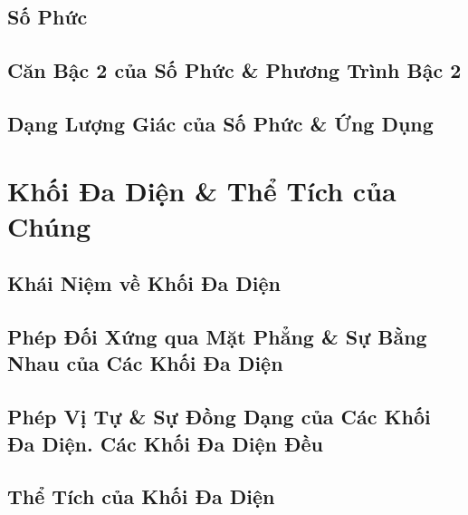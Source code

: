 \documentclass{article}
\numberwithin{equation}{section}
\begin{document}
\subsection{Số Phức}


\subsection{Căn Bậc 2 của Số Phức \& Phương Trình Bậc 2}


\subsection{Dạng Lượng Giác của Số Phức \& Ứng Dụng}


\section{Khối Đa Diện \& Thể Tích của Chúng}

\subsection{Khái Niệm về Khối Đa Diện}


\subsection{Phép Đối Xứng qua Mặt Phẳng \& Sự Bằng Nhau của Các Khối Đa Diện}


\subsection{Phép Vị Tự \& Sự Đồng Dạng của Các Khối Đa Diện. Các Khối Đa Diện Đều}


\subsection{Thể Tích của Khối Đa Diện}
\end{document}
